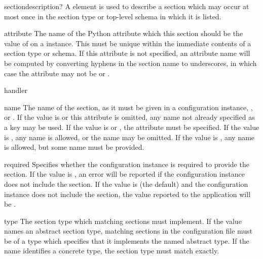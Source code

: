 \documentclass{howto}
\newcommand{\datatype}[1]{\strong{#1}}
\begin{document}
\begin{elementdesc}{section}{description?}
  A  element is used to describe a section which may
  occur at most once in the section type or top-level schema in which
  it is listed.

  \begin{attributedesc}{attribute}{\datatype{identifier}}
    The name of the Python attribute which this section should be the
    value of on a  instance.  This must be unique
    within the immediate contents of a section type or schema.  If
    this attribute is not specified, an attribute name will be
    computed by converting hyphens in the section name to underscores,
    in which case the  attribute may not be \code{*}
    or \code{+}.
  \end{attributedesc}

  \begin{attributedesc}{handler}{\datatype{basic-key}}
  \end{attributedesc}

  \begin{attributedesc}{name}{\datatype{basic-key}}
    The name of the section, as it must be given in a configuration
    instance, \code{*}, or \code{+}.  If the value is \code{*} or this
    attribute is omitted, any name not already specified as a key may
    be used.  If the value is \code{*} or \code{+}, the
     attribute must be specified.  If the value
    is \code{*}, any name is allowed, or the name may be omitted.  If
    the value is \code{+}, any name is allowed, but some name must be
    provided.
  \end{attributedesc}

  \begin{attributedesc}{required}{}
    Specifies whether the configuration instance is required to
    provide the section.  If the value is , an error will be
    reported if the configuration instance does not include the
    section.  If the value is  (the default) and the
    configuration instance does not include the section, the value
    reported to the application will be .
  \end{attributedesc}

  \begin{attributedesc}{type}{\datatype{basic-key}}
    The section type which matching sections must implement.  If the
    value names an abstract section type, matching sections in the
    configuration file must be of a type which specifies that it
    implements the named abstract type.  If the name identifies a
    concrete type, the section type must match exactly.
  \end{attributedesc}
\end{elementdesc}
\end{document}
